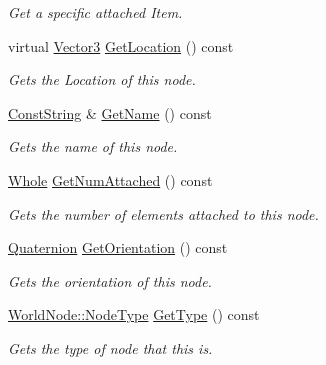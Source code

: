 \begin{DoxyCompactItemize}
\begin{DoxyCompactList}\small\item\em Get a specific attached Item. \item\end{DoxyCompactList}\item 
virtual \hyperlink{classMezzanine_1_1Vector3}{Vector3} \hyperlink{classMezzanine_1_1WorldNode_a7941d8f3347b810d31b511c3b59585f8}{GetLocation} () const 
\begin{DoxyCompactList}\small\item\em Gets the Location of this node. \item\end{DoxyCompactList}\item 
\hyperlink{namespaceMezzanine_a63cd699ac54b73953f35ec9cfc05e506}{ConstString} \& \hyperlink{classMezzanine_1_1WorldNode_a9538be39292a297f64d15bf1335ee0cf}{GetName} () const 
\begin{DoxyCompactList}\small\item\em Gets the name of this node. \item\end{DoxyCompactList}\item 
\hyperlink{namespaceMezzanine_adcbb6ce6d1eb4379d109e51171e2e493}{Whole} \hyperlink{classMezzanine_1_1WorldNode_a77a6e084b4383f125a9c6686eba7583d}{GetNumAttached} () const 
\begin{DoxyCompactList}\small\item\em Gets the number of elements attached to this node. \item\end{DoxyCompactList}\item 
\hyperlink{classMezzanine_1_1Quaternion}{Quaternion} \hyperlink{classMezzanine_1_1WorldNode_ad250735dcbc77c3c96bd4d6b21e43867}{GetOrientation} () const 
\begin{DoxyCompactList}\small\item\em Gets the orientation of this node. \item\end{DoxyCompactList}\item 
\hyperlink{classMezzanine_1_1WorldNode_a7b41cfe149e688905e56fb395d6a2493}{WorldNode::NodeType} \hyperlink{classMezzanine_1_1WorldNode_a524f3569c7e1999bd86a74d47ea4d884}{GetType} () const 
\begin{DoxyCompactList}\small\item\em Gets the type of node that this is. \item\end{DoxyCompactList}\item 

\end{DoxyCompactItemize}
